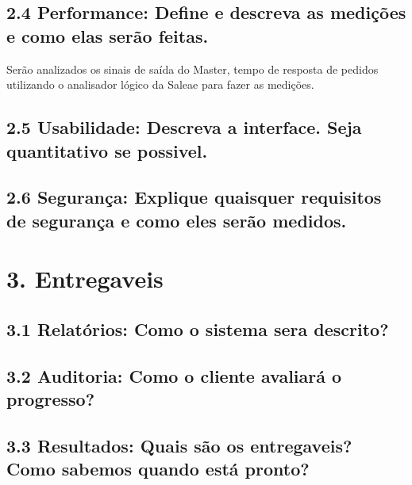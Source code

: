 \documentclass[11pt]{article}
\begin{document}
\subsection{2.4 Performance: Define e descreva as medições e como elas serão feitas.}
\label{sec:org994205f}
Serão analizados os sinais de saída do Master, tempo de resposta de pedidos utilizando o analisador lógico da Saleae para fazer as medições.

\subsection{2.5 Usabilidade: Descreva a interface. Seja quantitativo se possivel.}
\label{sec:org0cfa40c}

\subsection{2.6 Segurança: Explique quaisquer requisitos de segurança e como eles serão medidos.}
\label{sec:org7e36ac0}

\section{3. Entregaveis}
\label{sec:orgab2350b}
\subsection{3.1 Relatórios: Como o sistema sera descrito?}
\label{sec:org3b29b12}
\subsection{3.2 Auditoria: Como o cliente avaliará o progresso?}
\label{sec:orgdc6ff20}
\subsection{3.3 Resultados: Quais são os entregaveis? Como sabemos quando está pronto?}
\label{sec:orgfa6f3e1}
\end{document}
